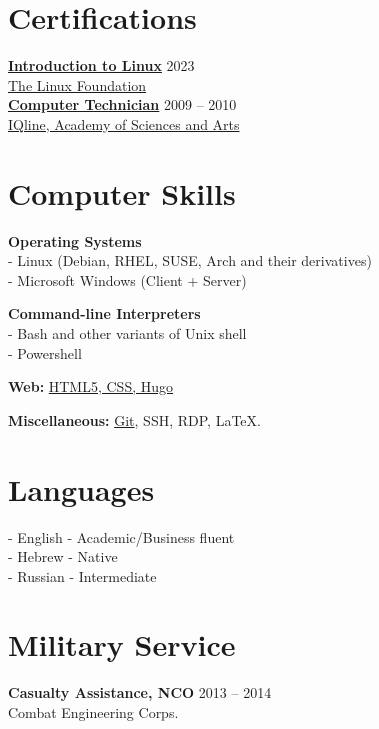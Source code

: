 \documentclass[
	12pt,a4paper %
]{article}
\begin{document}
\begin{paracol}{2} %

\section{Certifications}

\href{https://courses.edx.org/certificates/dc4f0cd758304785a2ea62cca29e6a86}{\textbf{Introduction to Linux}} \hfill 2023 \\
\href{https://courses.edx.org/certificates/dc4f0cd758304785a2ea62cca29e6a86}{The Linux Foundation} \\
\href{https://loona-il.000webhostapp.com/resume-references/computer-technitian-certificate.jpg}{\textbf{Computer Technician}} \hfill 2009 -- 2010 \\
\href{https://loona-il.000webhostapp.com/resume-references/computer-technitian-certificate.jpg}{IQline, Academy of Sciences and Arts}

\section{Computer Skills}

\textbf{Operating Systems} \\
 - Linux (Debian, RHEL, SUSE, Arch and their derivatives)\\
 - Microsoft Windows (Client + Server)

\textbf{Command-line Interpreters} \\
- Bash and other variants of Unix shell \\
- Powershell

\textbf{Web:} \href{https://kirilu.netlify.app/resume/}{HTML5, CSS, Hugo}


\textbf{Miscellaneous:} \href{https://github.com/kiril-u}{Git}, SSH, RDP, \LaTeX.

\switchcolumn

\section{Languages}
 - English - Academic/Business fluent \\
 - Hebrew - Native \\
 - Russian - Intermediate
\section{Military Service}
\textbf{Casualty Assistance, NCO} \hfill 2013 -- 2014 \\
Combat Engineering Corps.

\end{paracol}
\end{document}
